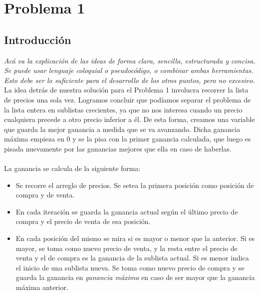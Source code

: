 \section{Problema 1}

\subsection{Introducción}
\textit{Acá va la explicación de las ideas de forma clara, sencilla, estructurada y concisa. Se puede usar lenguaje coloquial o pseudocódigo, o combinar ambas herramientas. Esto debe ser lo suficiente para el desarrollo de los otros puntos, pero no excesivo.}\\

La idea detrás de nuestra solución para el Problema 1 involucra recorrer la lista de precios una sola vez. Logramos concluir que podíamos separar el problema de la lista entera en sublistas crecientes, ya que no nos interesa cuando un precio cualquiera precede a otro precio inferior a él. De esta forma, creamos una variable que guarda la mejor ganancia a medida que se va avanzando. Dicha ganancia máxima empieza en 0 y se la pisa con la primer ganancia calculada, que luego es pisada nuevamente por las ganancias mejores que ella en caso de haberlas.\\
\\
\indent La ganancia se calcula de la siguiente forma:
\begin{itemize}
	\item Se recorre el arreglo de precios. Se setea la primera posición como posición de compra y de venta.
	\item En cada iteración se guarda la ganancia actual según el último precio de compra y el precio de venta de esa posición.
	\item En cada posición del mismo se mira si es mayor o menor que la anterior. Si es mayor, se toma como nuevo precio de venta, y la resta entre el precio de venta y el de compra es la ganancia de la sublista actual. Si es menor indica el inicio de una sublista nueva. Se toma como nuevo precio de compra y se guarda la ganancia en \textit{ganancia máxima} en caso de ser mayor que la ganancia máxima anterior.
\end{itemize}